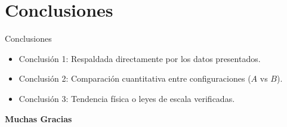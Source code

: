 \documentclass[aspectratio=169]{beamer}
\begin{document}
\section{Conclusiones}

\begin{frame}{Conclusiones}
  \vfill
  \begin{itemize}
    \item Conclusión 1: Respaldada directamente por los datos presentados.
    \vspace{0.6em}
    \item Conclusión 2: Comparación cuantitativa entre configuraciones ($A$ vs $B$).
    \vspace{0.6em}
    \item Conclusión 3: Tendencia física o leyes de escala verificadas.
  \end{itemize}
  \vfill
\end{frame}

\begin{frame}[plain]
  \vfill
  \centering
  \Huge \textbf{Muchas Gracias}
  \vfill
\end{frame}
\end{document}
